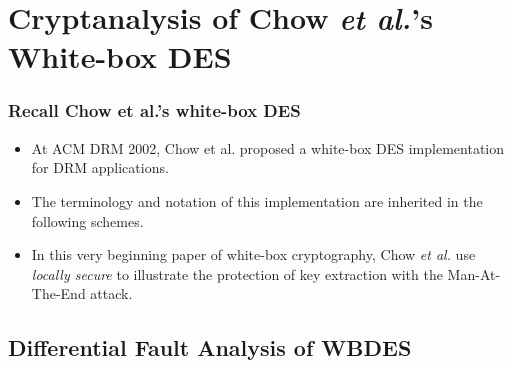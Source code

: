 \documentclass{beamer}
\begin{document}
\section{Cryptanalysis of Chow \textit{et al.}'s White-box DES}
\frame
{
  \frametitle{Recall Chow et al.'s white-box DES}

\begin{itemize}
\item At ACM DRM 2002, Chow et al. proposed a white-box DES implementation for DRM applications.
\item The terminology and notation of this implementation are inherited in the following schemes.
\item In this very beginning paper of white-box cryptography, Chow \textit{et al.} use \textit{locally secure} to illustrate the protection of key extraction with the Man-At-The-End attack.
\end{itemize}

\begin{center}
\end{center}
}

\subsection{Differential Fault Analysis of WBDES}
\end{document}
